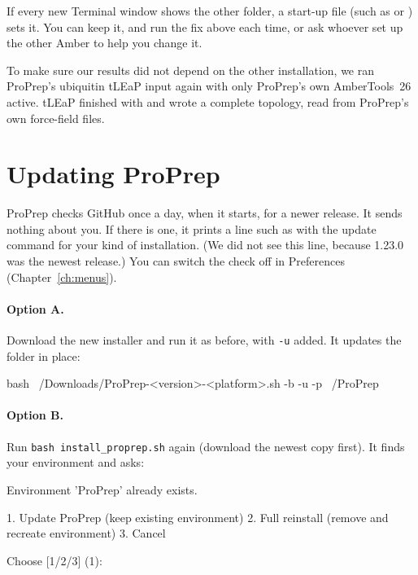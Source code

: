 \begin{tip}
If every new Terminal window shows the other folder, a start-up file (such as
 or ) sets it. You can keep it, and run the fix
above each time, or ask whoever set up the other Amber to help you change it.
\end{tip}

\begin{behindscenes}
To make sure our results did not depend on the other installation, we ran
ProPrep's ubiquitin tLEaP input again with only ProPrep's own AmberTools~26
active. tLEaP finished with  and wrote a
complete topology, read from ProPrep's own force-field files.
\end{behindscenes}

\section{Updating ProPrep}
\label{sec:installation-update}

ProPrep checks GitHub once a day, when it starts, for a newer release. It sends
nothing about you. If there is one, it prints a line such as
 with the update command
for your kind of installation. (We did not see this line, because 1.23.0 was
the newest release.) You can switch the check off in Preferences
(Chapter~\ref{ch:menus}).

\paragraph{Option A.} Download the new installer and run it as before, with
\texttt{-u} added. It updates the  folder in place:

\begin{terminal}
bash ~/Downloads/ProPrep-<version>-<platform>.sh -b -u -p ~/ProPrep
\end{terminal}

\paragraph{Option B.} Run \texttt{bash install\_proprep.sh} again (download
the newest copy first). It finds your environment and asks:

\begin{screen}
Environment 'ProPrep' already exists.

  1. Update ProPrep (keep existing environment)
  2. Full reinstall (remove and recreate environment)
  3. Cancel

Choose [1/2/3] (1):
\end{screen}

